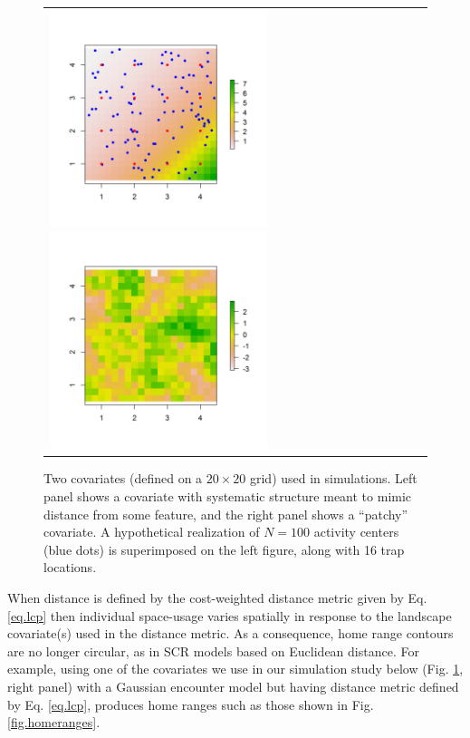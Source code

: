 \begin{figure}[h]
\begin{tabular}{ll}
\includegraphics[height=2.5in,width=2.5in]{Ch12-EcolDist/figs/raster_withN100}
\includegraphics[height=2.5in,width=2.5in]{Ch12-EcolDist/figs/raster_krige} &
\end{tabular}
\caption{Two covariates (defined on a $20 \times 20$ grid) used in simulations.
 Left panel shows a covariate with systematic structure meant
to mimic distance from some feature, and the right panel shows a ``patchy'' covariate.
A hypothetical realization of $N=100$ activity centers (blue dots) is superimposed
  on the left figure, along with 16 trap locations. }
\label{ecoldist.fig.raster100}
\end{figure}


When distance is defined by the cost-weighted distance metric given
by Eq. \ref{eq.lcp} then individual space-usage varies
spatially in response to the landscape covariate(s) used in the
distance metric.  As a consequence, home range contours are no longer
circular, as in SCR models based on Euclidean distance.
For example, using one of the covariates we use in
our simulation study below (Fig. \ref{ecoldist.fig.raster100}, right
panel) with a Gaussian
encounter model but having distance
metric defined by Eq. \ref{eq.lcp}, produces home ranges such
as those shown in Fig. \ref{fig.homeranges}.


